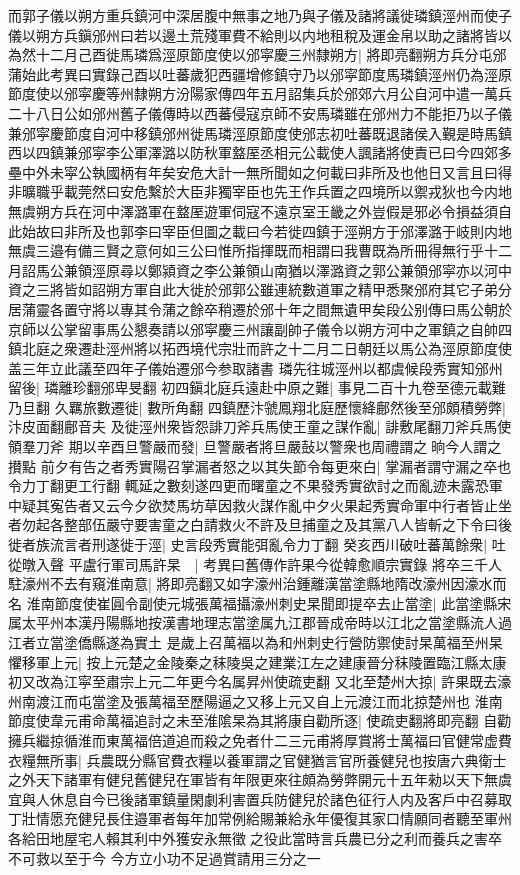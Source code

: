 而郭子儀以朔方重兵鎮河中深居腹中無事之地乃與子儀及諸將議徙璘鎮涇州而使子儀以朔方兵鎭邠州曰若以邊土荒殘軍費不給則以内地租稅及運金帛以助之諸將皆以為然十二月己酉徙馬璘爲涇原節度使以邠寜慶三州隸朔方|{
	將即亮翻朔方兵分屯邠蒲始此考異曰實錄己酉以吐蕃歲犯西疆增修鎮守乃以邠寜節度馬璘鎮涇州仍為涇原節度使以邠寜慶等州隸朔方汾陽家傳四年五月詔集兵於邠郊六月公自河中遣一萬兵二十八日公如邠州舊子儀傳時以西蕃侵寇京師不安馬璘雖在邠州力不能拒乃以子儀兼邠寜慶節度自河中移鎮邠州徙馬璘涇原節度使邠志初吐蕃既退諸侯入覲是時馬鎮西以四鎮兼邠寜李公軍澤潞以防秋軍盩厔丞相元公載使人諷諸將使責已曰今四郊多壘中外未寜公執國柄有年矣安危大計一無所聞如之何載曰非所及也他日又言且曰得非曠職乎載莞然曰安危繫於大臣非獨宰臣也先王作兵置之四境所以禦戎狄也今内地無虞朔方兵在河中澤潞軍在盩厔遊軍伺寇不遠京室王畿之外豈假是邪必令損益須自此始故曰非所及也郭李曰宰臣但圖之載曰今若徙四鎮于涇朔方于邠澤潞于岐則内地無虞三邉有備三賢之意何如三公曰惟所指揮既而相謂曰我曹既為所冊得無行乎十二月詔馬公兼領涇原尋以鄭潁資之李公兼領山南猶以澤潞資之郭公兼領邠寜亦以河中資之三將皆如詔朔方軍自此大徙於邠郭公雖連統數道軍之精甲悉聚邠府其它子弟分居蒲靈各置守將以專其令蒲之餘卒稍遷於邠十年之間無遺甲矣段公别傳曰馬公朝於京師以公掌留事馬公懇奏請以邠寜慶三州讓副帥子儀令以朔方河中之軍鎮之自帥四鎮北庭之衆遷赴涇州將以拓西境代宗壯而許之十二月二日朝廷以馬公為涇原節度使盖三年立此議至四年子儀始遷邠今参取諸書}
璘先往城涇州以都虞候段秀實知邠州留後|{
	璘離珍翻邠卑旻翻}
初四鎭北庭兵遠赴中原之難|{
	事見二百十九卷至德元載難乃旦翻}
久羈旅數遷徙|{
	數所角翻}
四鎮歷汴虢鳳翔北庭歷懷絳鄜然後至邠頗積勞弊|{
	汴皮面翻鄜音夫}
及徙涇州衆皆怨誹刀斧兵馬使王童之謀作亂|{
	誹敷尾翻刀斧兵馬使領羣刀斧}
期以辛酉旦警嚴而發|{
	旦警嚴者將旦嚴鼔以警衆也周禮謂之晌今人謂之攅點}
前夕有告之者秀實陽召掌漏者怒之以其失節令每更來白|{
	掌漏者謂守漏之卒也令力丁翻更工行翻}
輒延之數刻遂四更而曙童之不果發秀實欲討之而亂迹未露恐軍中疑其寃告者又云今夕欲焚馬坊草因救火謀作亂中夕火果起秀實命軍中行者皆止坐者勿起各整部伍嚴守要害童之白請救火不許及旦捕童之及其黨八人皆斬之下令曰後徙者族流言者刑遂徙于涇|{
	史言段秀實能弭亂令力丁翻}
癸亥西川破吐蕃萬餘衆|{
	吐從暾入聲}
平盧行軍司馬許杲　|{
	考異曰舊傳作許果今從韓愈順宗實錄}
將卒三千人駐濠州不去有窺淮南意|{
	將即亮翻又如字濠州治鍾離漢當塗縣地隋改濠州因濠水而名}
淮南節度使崔圓令副使元城張萬福攝濠州刺史杲聞即提卒去止當塗|{
	此當塗縣宋属太平州本漢丹陽縣地按漢書地理志當塗属九江郡晉成帝時以江北之當塗縣流人過江者立當塗僑縣遂為實土}
是歲上召萬福以為和州刺史行營防禦使討杲萬福至州杲懼移軍上元|{
	按上元楚之金陵秦之秣陵吳之建業江左之建康晉分秣陵置臨江縣太康初又改為江寜至肅宗上元二年更今名属昇州使疏吏翻}
又北至楚州大掠|{
	許果既去濠州南渡江而屯當塗及張萬福至歷陽逼之又移上元又自上元渡江而北掠楚州也}
淮南節度使韋元甫命萬福追討之未至淮隂杲為其將康自勸所逐|{
	使疏吏翻將即亮翻}
自勸擁兵繼掠循淮而東萬福倍道追而殺之免者什二三元甫將厚賞將士萬福曰官健常虚費衣糧無所事|{
	兵農既分縣官費衣糧以養軍謂之官健猶言官所養健兒也按唐六典衛士之外天下諸軍有健兒舊健兒在軍皆有年限更來往頗為勞弊開元十五年勑以天下無虞宜與人休息自今已後諸軍鎮量閑劇利害置兵防健兒於諸色征行人内及客戶中召募取丁壯情愿充健兒長住邉軍者每年加常例給賜兼給永年優復其家口情願同者聽至軍州各給田地屋宅人賴其利中外獲安永無徵之役此當時言兵農已分之利而養兵之害卒不可救以至于今}
今方立小功不足過賞請用三分之一

